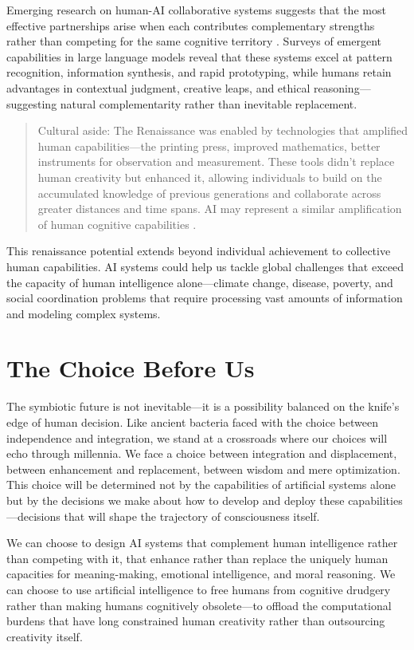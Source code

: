 Emerging research on human-AI collaborative systems suggests that the most effective partnerships arise when each contributes complementary strengths rather than competing for the same cognitive territory \parencite{berti2025emergent}. Surveys of emergent capabilities in large language models reveal that these systems excel at pattern recognition, information synthesis, and rapid prototyping, while humans retain advantages in contextual judgment, creative leaps, and ethical reasoning—suggesting natural complementarity rather than inevitable replacement.

\begin{quote}\small
Cultural aside: The Renaissance was enabled by technologies that amplified human capabilities—the printing press, improved mathematics, better instruments for observation and measurement. These tools didn't replace human creativity but enhanced it, allowing individuals to build on the accumulated knowledge of previous generations and collaborate across greater distances and time spans. AI may represent a similar amplification of human cognitive capabilities \parencite{eisenstein1979printing}.
\end{quote}

This renaissance potential extends beyond individual achievement to collective human capabilities. AI systems could help us tackle global challenges that exceed the capacity of human intelligence alone—climate change, disease, poverty, and social coordination problems that require processing vast amounts of information and modeling complex systems.

\section{The Choice Before Us}

The symbiotic future is not inevitable—it is a possibility balanced on the knife's edge of human decision. Like ancient bacteria faced with the choice between independence and integration, we stand at a crossroads where our choices will echo through millennia. We face a choice between integration and displacement, between enhancement and replacement, between wisdom and mere optimization. This choice will be determined not by the capabilities of artificial systems alone but by the decisions we make about how to develop and deploy these capabilities—decisions that will shape the trajectory of consciousness itself.

We can choose to design AI systems that complement human intelligence rather than competing with it, that enhance rather than replace the uniquely human capacities for meaning-making, emotional intelligence, and moral reasoning. We can choose to use artificial intelligence to free humans from cognitive drudgery rather than making humans cognitively obsolete—to offload the computational burdens that have long constrained human creativity rather than outsourcing creativity itself.

